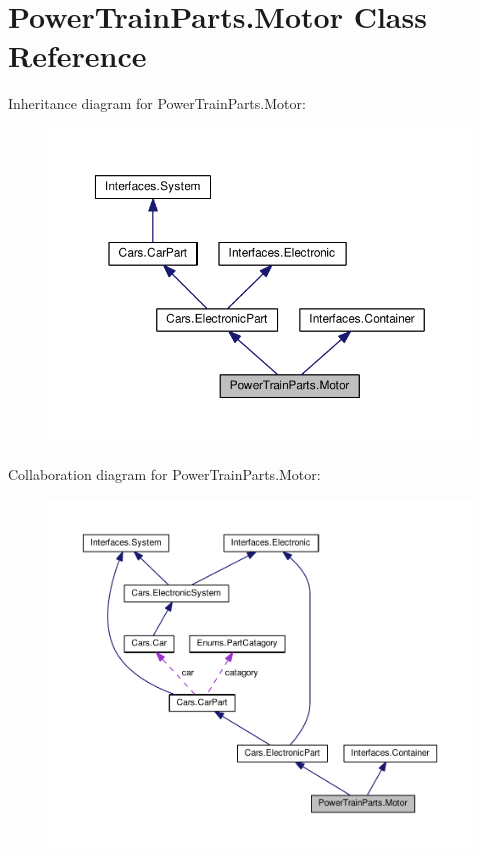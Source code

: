 \hypertarget{classPowerTrainParts_1_1Motor}{}\section{Power\+Train\+Parts.\+Motor Class Reference}
\label{classPowerTrainParts_1_1Motor}


Inheritance diagram for Power\+Train\+Parts.\+Motor\+:\nopagebreak
\begin{figure}[H]
\begin{center}
\leavevmode
\includegraphics[width=350pt]{classPowerTrainParts_1_1Motor__inherit__graph}
\end{center}
\end{figure}


Collaboration diagram for Power\+Train\+Parts.\+Motor\+:\nopagebreak
\begin{figure}[H]
\begin{center}
\leavevmode
\includegraphics[width=350pt]{classPowerTrainParts_1_1Motor__coll__graph}
\end{center}
\end{figure}
